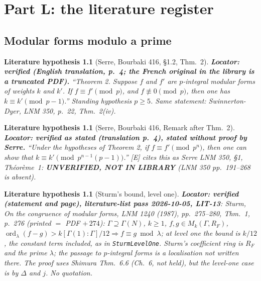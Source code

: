 \newtheorem{hypothesis}[theorem]{Literature hypothesis}

\chapter{Part L: the literature register}

\section{Modular forms modulo a prime}

\begin{hypothesis}[Serre, Bourbaki 416, \S1.2, Thm.~2]\label{lit:serre416-thm2}
   \leanok
  \textbf{Locator: verified (English translation, p.~4; the French original in the library is a truncated PDF).}
  ``Theorem 2. Suppose $f$ and $f'$ are $p$-integral modular forms of weights $k$ and $k'$. If $f\equiv f'\pmod p$,
  and $f\not\equiv0\pmod p$, then one has $k\equiv k'\pmod{p-1}$.'' Standing hypothesis $p\ge5$.
  Same statement: Swinnerton-Dyer, LNM 350, p.~22, Thm.~2(iv).
\end{hypothesis}

\begin{hypothesis}[Serre, Bourbaki 416, Remark after Thm.~2]\label{lit:serre416-pow}
   \leanok
  \textbf{Locator: verified as stated (translation p.~4), stated without proof by Serre.}
  ``Under the hypotheses of Theorem 2, if $f\equiv f'\pmod{p^n}$, then one can show that
  $k\equiv k'\pmod{p^{n-1}(p-1)}$.'' [E] cites this as Serre LNM 350, \S1, Th\'eor\`eme~1: \textbf{UNVERIFIED,
  NOT IN LIBRARY} (LNM 350 pp.~191--268 is absent).
\end{hypothesis}

\begin{hypothesis}[Sturm's bound, level one]\label{lit:sturm}
   \leanok
  \textbf{Locator: verified (statement and page), literature-list pass 2026-10-05, LIT-13}: Sturm, \emph{On the congruence of
  modular forms}, LNM 1240 (1987), pp.~275--280, Thm.~1, p.~276 (printed $=$ PDF $+\,274$): $\Gamma\supseteq\Gamma(N)$, $k\ge1$,
  $f,g\in M_k(\Gamma,R_F)$, $\operatorname{ord}_\lambda(f-g)>k[\Gamma(1):\Gamma]/12\Rightarrow f\equiv g\bmod\lambda$; at level one the
  bound is $k/12$, the constant term included, as in \texttt{SturmLevelOne}. Sturm's coefficient ring is $R_F$ and the prime
  $\lambda$; the passage to $p$-integral forms is a localisation not written there. The proof uses Shimura Thm.~6.6 (Ch.~6, not
  held), but the level-one case is by $\Delta$ and $j$. No quotation.
\end{hypothesis}

